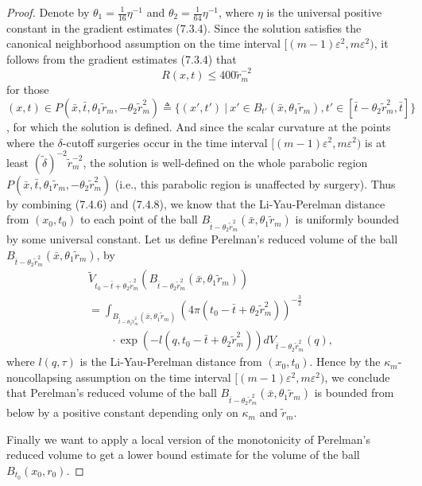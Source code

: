 \begin{proof}
Denote by $\theta_1 = \frac{1}{16}\eta^{-1}$ and $\theta_2 =
\frac{1}{64}\eta^{-1}$, where $\eta$ is the universal positive
constant in the gradient estimates (7.3.4). Since the solution
satisfies the canonical neighborhood assumption on the time
interval $[(m-1)\varepsilon^2,m\varepsilon^2)$, it follows from
the gradient estimates (7.3.4) that \begin{equation}
R(x,t)\leq 400\widetilde{r}^{-2}_m  %
\end{equation} for those $(x,t)\in P(\bar{x},\bar{t},\theta_1\widetilde{r}_m,
-\theta_2\widetilde{r}^2_m)\triangleq\{(x',t')\ |\ x'\in
B_{t'}(\bar{x},\theta_1\widetilde{r}_m),t'\in[\bar{t}
-\theta_2\widetilde{r}^2_m,\bar{t}]\}$, for which the solution is
defined. And since the scalar curvature at the points where the
$\delta$-cutoff surgeries occur in the time interval
$[(m-1)\varepsilon^2,m\varepsilon^2)$ is at least
$(\widetilde{\delta})^{-2}\widetilde{r}^{-2}_m$, the solution is
well-defined on the whole parabolic region
$P(\bar{x},\bar{t},\theta_1\widetilde{r}_m,-\theta_2\widetilde{r}^2_m)$
(i.e., this parabolic region is unaffected by surgery). Thus by
combining (7.4.6) and (7.4.8), we know that the Li-Yau-Perelman
distance from $(x_0,t_0)$ to each point of the ball
$B_{\bar{t}-\theta_2\widetilde{r}^2_m}(\bar{x},
\theta_1\widetilde{r}_m)$ is uniformly bounded by some universal
constant. Let us define Perelman's reduced volume of the ball
$B_{\bar{t}-\theta_2\widetilde{r}^2_m}(\bar{x},
\theta_1\widetilde{r}_m)$, by
\begin{align*}
&\widetilde{V}_{t_0-\bar{t}+\theta_2\widetilde{r}^2_m}
(B_{\bar{t}-\theta_2\widetilde{r}^2_m}(\bar{x},\theta_1\widetilde{r}_m))\\
&=\int_{B_{\bar{t}-\theta_2\widetilde{r}^2_m}(\bar{x},
\theta_1\widetilde{r}_m)}(4\pi(t_0-\bar{t}+\theta_2\widetilde{r}^2_m))^
{-\frac{3}{2}} \\
&\qquad\cdot\exp(-l(q,t_0-\bar{t}+\theta_2\widetilde{r}^2_m))
dV_{\bar{t}-\theta_2\widetilde{r}^2_m}(q),
\end{align*}
where $l(q,\tau)$ is the Li-Yau-Perelman distance from
$(x_0,t_0)$. Hence by the $\kappa_m$-noncollapsing assumption on
the time interval $[(m-1)\varepsilon^2,m\varepsilon^2)$, we
conclude that Perelman's reduced volume of the ball
$B_{\bar{t}-\theta_2\widetilde{r}^2_m}(\bar{x},\theta_1\widetilde{r}_m)$
is bounded from below by a positive constant depending only on
$\kappa_m$ and $\widetilde{r}_m$.

Finally we want to apply a local version of the monotonicity of
Perelman's reduced volume to get a lower bound estimate for the
volume of the ball $B_{t_0}(x_0,r_0)$.


\end{proof}
